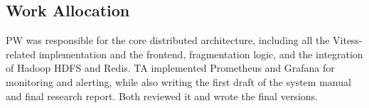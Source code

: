 \documentclass{article}
\begin{document}
\subsection*{Work Allocation}
PW was responsible for the core distributed architecture, including all the Vitess-related implementation and the frontend, fragmentation logic, and the integration of Hadoop HDFS and Redis. TA implemented Prometheus and Grafana for monitoring and alerting, while also writing the first draft of the system manual and final research report. Both reviewed it and wrote the final versions.


\end{document}
